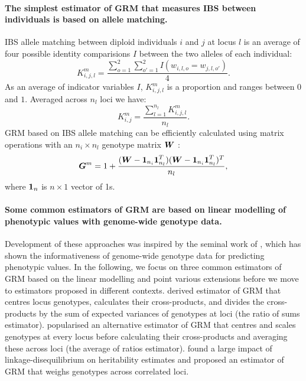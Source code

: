 \paragraph{The simplest estimator of GRM that measures IBS between
individuals is based on allele matching.}
%
IBS allele matching between diploid individuals $i$ and $j$ at locus $l$
is an average of four possible identity comparisions $I$ between the two
alleles of each individual:
%
\begin{equation} \label{eqn:K_m_locus}
  K_{i,j,l}^{m} = \frac{\sum_{o=1}^2 \sum_{o'=1}^2 I\left(w_{i,l,o} = w_{j,l,o'}\right)}{4}.
\end{equation}
%
As an average of indicator variables $I$, $K_{i,j,l}^{m}$ is a
proportion and ranges between $0$ and $1$.
%
Averaged across $n_l$ loci we have:
%
\begin{equation} \label{eqn:K_m}
  K_{i,j}^{m} = \frac{\sum_{l=1}^{n_l} K_{i,j,l}^{m}}{n_l}.
\end{equation}
%
GRM based on IBS allele matching can be efficiently calculated using
matrix operations with an $n_i \times n_l$ genotype matrix $\boldsymbol{W}$
\citep{vanraden2007efficient, vanraden2008efficient, astle2009population}:
%
\begin{equation} \label{eqn:G_m}
  \boldsymbol{G}^{m} = 1 + \frac{(\boldsymbol{W} - \boldsymbol{1}_{n_i}\boldsymbol{1}_{n_l}^T)
                            (\boldsymbol{W} - \boldsymbol{1}_{n_i}\boldsymbol{1}_{n_l}^T)^T}{n_l},
\end{equation}
%
where $\boldsymbol{1}_n$ is $n \times 1$ vector of 1s.

\paragraph{Some common estimators of GRM are based on linear
modelling of phenotypic values with genome-wide genotype data.}
%
Development of these approaches was inspired by the seminal work of
\cite{meuwissen2001prediction}, which has shown the informativeness of
genome-wide genotype data for predicting phenotypic values.
%
In the following, we focus on three common estimators of GRM
based on the linear modelling
\citep{vanraden2008efficient, yang2010common, speed2012improved}
and point various extensions before we move to estimators proposed
in different contexts.
%
\cite{vanraden2008efficient} derived estimator of GRM that centres
locus genotypes, calculates their cross-products, and divides the
cross-products by the sum of expected variances of genotypes at loci
(the ratio of sums estimator).
%
\cite{yang2010common} popularised an alternative estimator of GRM
that centres and scales genotypes at every locus before calculating
their cross-products and averaging these across loci
(the average of ratios estimator).
%
\cite{speed2012improved} found a large impact of linkage-disequilibrium
on heritability estimates and proposed an estimator of GRM that
weighs genotypes across correlated loci.

